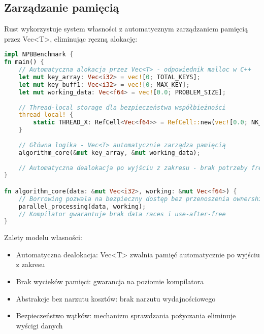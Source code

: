 \subsection{Zarządzanie pamięcią}
Rust wykorzystuje system własności z automatycznym zarządzaniem pamięcią przez Vec<T>, eliminując ręczną alokację:
\begin{lstlisting}[language=Rust, caption={Zarządzanie pamięcią w benchmarkach NPB w języku Rust}, label={lst:rust_memory_management}]
impl NPBBenchmark {
fn main() {
    // Automatyczna alokacja przez Vec<T> - odpowiednik malloc w C++
    let mut key_array: Vec<i32> = vec![0; TOTAL_KEYS];
    let mut key_buff1: Vec<i32> = vec![0; MAX_KEY];
    let mut working_data: Vec<f64> = vec![0.0; PROBLEM_SIZE];
    
    // Thread-local storage dla bezpieczeństwa współbieżności
    thread_local! {
        static THREAD_X: RefCell<Vec<f64>> = RefCell::new(vec![0.0; NK_PLUS]);
    }
    
    // Główna logika - Vec<T> automatycznie zarządza pamięcią
    algorithm_core(&mut key_array, &mut working_data);
    
    // Automatyczna dealokacja po wyjściu z zakresu - brak potrzeby free()
}

fn algorithm_core(data: &mut Vec<i32>, working: &mut Vec<f64>) {
    // Borrowing pozwala na bezpieczny dostęp bez przenoszenia ownership
    parallel_processing(data, working);
    // Kompilator gwarantuje brak data races i use-after-free
}
\end{lstlisting}
Zalety modelu własności:
\begin{itemize}
    \item Automatyczna dealokacja: Vec<T> zwalnia pamięć automatycznie po wyjściu z zakresu
    \item Brak wycieków pamięci: gwarancja na poziomie kompilatora
    \item Abstrakcje bez narzutu kosztów: brak narzutu wydajnościowego
    \item Bezpieczeństwo wątków: mechanizm sprawdzania pożyczania eliminuje wyścigi danych
\end{itemize}

